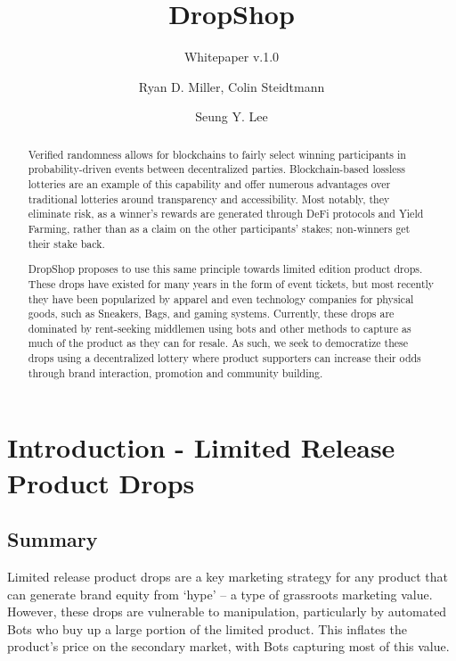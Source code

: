 \documentclass[runningheads]{llncs}
\begin{document}
%
\title{DropShop }%
\subtitle{Whitepaper v.1.0}
%
%
\author{Ryan D. Miller, Colin Steidtmann \and Seung Y. Lee}
%
%
%
\maketitle              %
%

\begin{abstract}
Verified randomness allows for blockchains to fairly select winning participants in probability-driven events between decentralized parties.  Blockchain-based lossless lotteries are an example of this capability and offer numerous advantages over traditional lotteries around transparency and accessibility.  Most notably, they eliminate risk, as a winner’s rewards are generated through DeFi protocols and Yield Farming, rather than as a claim on the other participants' stakes; non-winners get their stake back.

DropShop proposes to use this same principle towards limited edition product drops.  These drops have existed for many years in the form of event tickets, but most recently they have been popularized by apparel and even technology companies for physical goods, such as Sneakers, Bags, and gaming systems.  Currently, these drops are dominated by rent-seeking middlemen using bots and other methods to capture as much of the product as they can for resale.  As such, we seek to democratize these drops using a decentralized lottery where product supporters can increase their odds through brand interaction, promotion and community building.


\end{abstract}
%
%
%
\section{Introduction - Limited Release Product Drops}\label{intro-sec}

\subsection{Summary}
Limited release product drops are a key marketing strategy for any product that can generate brand equity from ‘hype’ – a type of grassroots marketing value.  However, these drops are vulnerable to manipulation, particularly by automated Bots who buy up a large portion of the limited product.  This inflates the product’s price on the secondary market, with Bots capturing most of this value.  
\end{document}
